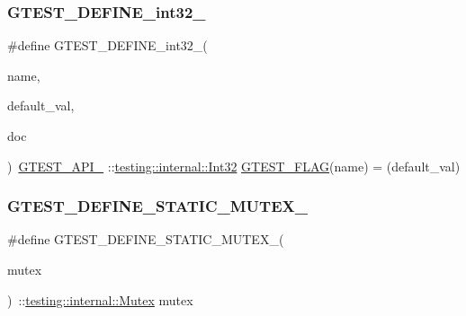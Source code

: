 \subsubsection{\texorpdfstring{GTEST\_DEFINE\_int32\_}{GTEST\_DEFINE\_int32\_}}
{\footnotesize\ttfamily \#define G\+T\+E\+S\+T\+\_\+\+D\+E\+F\+I\+N\+E\+\_\+int32\+\_\+(\begin{DoxyParamCaption}\item[{}]{name,  }\item[{}]{default\+\_\+val,  }\item[{}]{doc }\end{DoxyParamCaption})~\mbox{\hyperlink{_obj__test_2lib_2googletest-release-1_88_81_2googletest_2include_2gtest_2internal_2gtest-port_8h_aa73be6f0ba4a7456180a94904ce17790}{G\+T\+E\+S\+T\+\_\+\+A\+P\+I\+\_\+}} \+::\mbox{\hyperlink{namespacetesting_1_1internal_af89e21e4043b5cf0c120af487b24fa06}{testing\+::internal\+::\+Int32}} \mbox{\hyperlink{_obj__test_2lib_2googletest-release-1_88_81_2googletest_2include_2gtest_2internal_2gtest-port_8h_a828f4e34a1c4b510da50ec1563e3562a}{G\+T\+E\+S\+T\+\_\+\+F\+L\+AG}}(name) = (default\+\_\+val)}

\mbox{\label{_obj__test_2lib_2googletest-release-1_88_81_2googletest_2include_2gtest_2internal_2gtest-port_8h_a85d5cd679fdbe87383e7dfd1c6651eaa}} 
\subsubsection{\texorpdfstring{GTEST\_DEFINE\_STATIC\_MUTEX\_}{GTEST\_DEFINE\_STATIC\_MUTEX\_}}
{\footnotesize\ttfamily \#define G\+T\+E\+S\+T\+\_\+\+D\+E\+F\+I\+N\+E\+\_\+\+S\+T\+A\+T\+I\+C\+\_\+\+M\+U\+T\+E\+X\+\_\+(\begin{DoxyParamCaption}\item[{}]{mutex }\end{DoxyParamCaption})~\+::\mbox{\hyperlink{classtesting_1_1internal_1_1_mutex}{testing\+::internal\+::\+Mutex}} mutex}

\mbox{\label{_obj__test_2lib_2googletest-release-1_88_81_2googletest_2include_2gtest_2internal_2gtest-port_8h_a885e18fe217a6e85553d408b99252c12}} 
